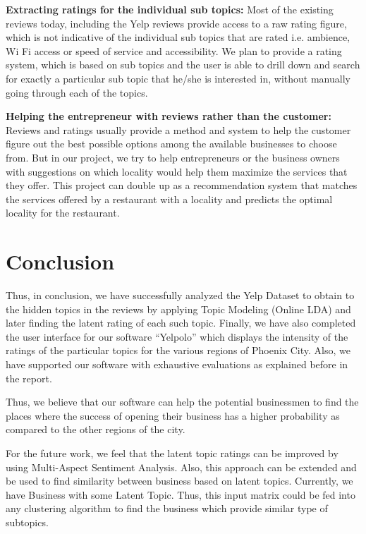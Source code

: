 \documentclass[12pt]{article} %
\begin{document}
\textbf{Extracting ratings for the individual sub topics:} Most of the existing reviews today, including the Yelp reviews provide access to a raw rating figure, which is not indicative of the individual sub topics that are rated i.e. ambience, Wi Fi access or speed of service and accessibility. We plan to provide a rating system, which is based on sub topics and the user is able to drill down and search for exactly a particular sub topic that he/she is interested in, without manually going through each of the topics.

\textbf{Helping the entrepreneur with reviews rather than the customer:} Reviews and ratings usually provide a method and system to help the customer figure out the best possible options among the available businesses to choose from. But in our project, we try to help entrepreneurs or the business owners with suggestions on which locality would help them maximize the services that they offer. This project can double up as a recommendation system that matches the services offered by a restaurant with a locality and predicts the optimal locality for the restaurant.


\section{Conclusion}

Thus, in conclusion, we have successfully analyzed the Yelp Dataset to obtain to the hidden topics in the reviews by applying Topic Modeling (Online LDA) and later finding the latent rating of each such topic. Finally, we have also completed the user interface for our software ``Yelpolo'' which displays the intensity of the ratings of the particular topics for the various regions of Phoenix City. Also, we have supported our software with exhaustive evaluations as explained before in the report.

Thus, we believe that our software can help the potential businessmen to find the places where the success of opening their business has a higher probability as compared to the other regions of the city. 

For the future work, we feel that the latent topic ratings can be improved by using Multi-Aspect Sentiment Analysis. 
Also, this approach can be extended and  be used to find similarity between business based on latent topics. Currently, we have Business with some Latent Topic. Thus, this input matrix could be fed into any clustering algorithm to find the business which provide similar type of subtopics.
\end{document}
